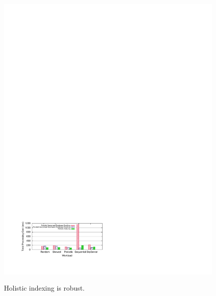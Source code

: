 \begin{figure}[!htb]
\begin{center}
\includegraphics[trim=1.8cm 2cm 0cm 22.8cm]{Figures/holistic/sev_workloads}
\vspace{-0.25 in}
\caption{Holistic indexing is robust.}
\vspace{-0.7 cm}
\label{fig:stochastic}
\end{center}
\end{figure}


